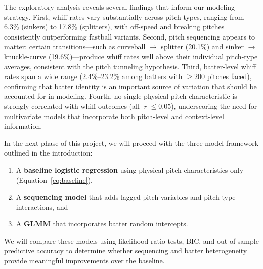 \documentclass[11pt]{article}
\newcommand{\batterLow}{2.4}             %
\newcommand{\batterHigh}{23.2}           %
\begin{document}
The exploratory analysis reveals several findings that inform our modeling strategy.
First, whiff rates vary substantially across pitch types, ranging from 6.3\% (sinkers) to 17.8\% (splitters), with off-speed and breaking pitches consistently outperforming fastball variants.
Second, pitch sequencing appears to matter: certain transitions---such as curveball $\rightarrow$ splitter (20.1\%) and sinker $\rightarrow$ knuckle-curve (19.6\%)---produce whiff rates well above their individual pitch-type averages, consistent with the pitch tunneling hypothesis.
Third, batter-level whiff rates span a wide range (\batterLow\%--\batterHigh\% among batters with $\geq 200$ pitches faced), confirming that batter identity is an important source of variation that should be accounted for in modeling.
Fourth, no single physical pitch characteristic is strongly correlated with whiff outcomes (all $|r| \leq 0.05$), underscoring the need for multivariate models that incorporate both pitch-level and context-level information.

In the next phase of this project, we will proceed with the three-model framework outlined in the introduction:
\begin{enumerate}[nosep]
    \item A \textbf{baseline logistic regression} using physical pitch characteristics only (Equation~\ref{eq:baseline}),
    \item A \textbf{sequencing model} that adds lagged pitch variables and pitch-type interactions, and
    \item A \textbf{GLMM} that incorporates batter random intercepts.
\end{enumerate}
We will compare these models using likelihood ratio tests, BIC, and out-of-sample predictive accuracy to determine whether sequencing and batter heterogeneity provide meaningful improvements over the baseline.


\newpage


\end{document}
